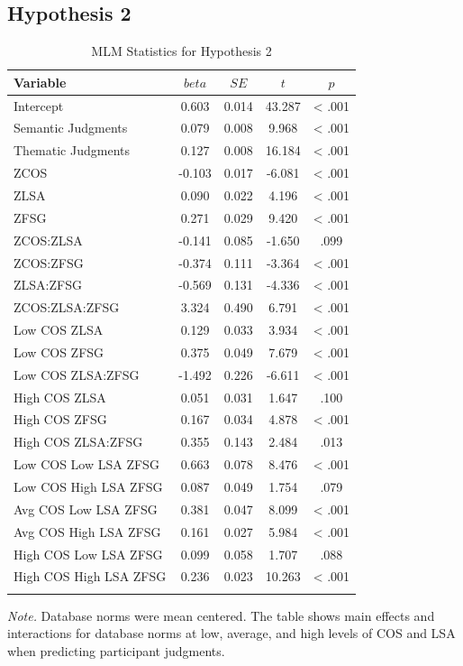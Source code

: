\documentclass[english,man]{apa6}
\theoremstyle{definition}
\theoremstyle{definition}
\theoremstyle{remark}
\begin{document}
\subsection{Hypothesis 2}\label{hypothesis-2}

\begin{table}[tbp]
\begin{center}
\begin{threeparttable}
\caption{\label{tab:hyp2-table}MLM Statistics for Hypothesis 2}
\small{
\begin{tabular}{lcccc}
\toprule
Variable & \multicolumn{1}{c}{$beta$} & \multicolumn{1}{c}{$SE$} & \multicolumn{1}{c}{$t$} & \multicolumn{1}{c}{$p$}\\
\midrule
Intercept & 0.603 & 0.014 & 43.287 & < .001\\
Semantic Judgments & 0.079 & 0.008 & 9.968 & < .001\\
Thematic Judgments & 0.127 & 0.008 & 16.184 & < .001\\
ZCOS & -0.103 & 0.017 & -6.081 & < .001\\
ZLSA & 0.090 & 0.022 & 4.196 & < .001\\
ZFSG & 0.271 & 0.029 & 9.420 & < .001\\
ZCOS:ZLSA & -0.141 & 0.085 & -1.650 & .099\\
ZCOS:ZFSG & -0.374 & 0.111 & -3.364 & < .001\\
ZLSA:ZFSG & -0.569 & 0.131 & -4.336 & < .001\\
ZCOS:ZLSA:ZFSG & 3.324 & 0.490 & 6.791 & < .001\\
Low COS ZLSA & 0.129 & 0.033 & 3.934 & < .001\\
Low COS ZFSG & 0.375 & 0.049 & 7.679 & < .001\\
Low COS ZLSA:ZFSG & -1.492 & 0.226 & -6.611 & < .001\\
High COS ZLSA & 0.051 & 0.031 & 1.647 & .100\\
High COS ZFSG & 0.167 & 0.034 & 4.878 & < .001\\
High COS ZLSA:ZFSG & 0.355 & 0.143 & 2.484 & .013\\
Low COS Low LSA ZFSG & 0.663 & 0.078 & 8.476 & < .001\\
Low COS High LSA ZFSG & 0.087 & 0.049 & 1.754 & .079\\
Avg COS Low LSA ZFSG & 0.381 & 0.047 & 8.099 & < .001\\
Avg COS High LSA ZFSG & 0.161 & 0.027 & 5.984 & < .001\\
High COS Low LSA ZFSG & 0.099 & 0.058 & 1.707 & .088\\
High COS High LSA ZFSG & 0.236 & 0.023 & 10.263 & < .001\\
\bottomrule
\addlinespace
\end{tabular}
}
\begin{tablenotes}[para]
\textit{Note.} Database norms were mean centered. The table shows main effects and interactions for database norms at low, average, and high levels of COS and LSA when predicting participant judgments.
\end{tablenotes}
\end{threeparttable}
\end{center}
\end{table}
\end{document}
